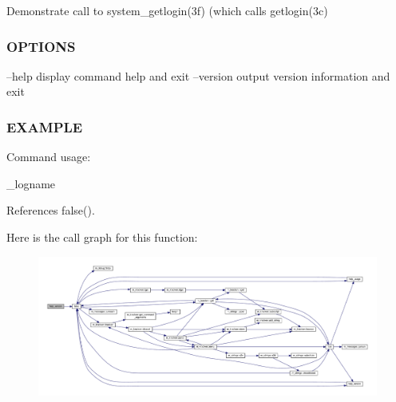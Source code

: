 Demonstrate call to system\+\_\+getlogin(3f) (which calls getlogin(3c) \subsubsection*{O\+P\+T\+I\+O\+NS}

--help display command help and exit --version output version information and exit \subsubsection*{E\+X\+A\+M\+P\+LE}

\begin{DoxyVerb}   Command usage:

     _logname \end{DoxyVerb}
 

References false().

Here is the call graph for this function\+:
\nopagebreak
\begin{figure}[H]
\begin{center}
\leavevmode
\includegraphics[width=350pt]{__logname_8f90_a39c21619b08a3c22f19e2306efd7f766_cgraph}
\end{center}
\end{figure}
